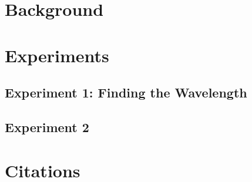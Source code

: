 \documentclass[twocolumn]{article}
\begin{document}
  

\graphicspath{{./images/}}



\onecolumn
\tableofcontents

\clearpage

\twocolumn
\section{Background}






		

		
\section{Experiments}
	\subsection{Experiment 1: Finding the Wavelength}
		
	\subsection{Experiment 2}
	
\clearpage	
	
\appendix



\clearpage



\section{Citations}

 
\end{document}
